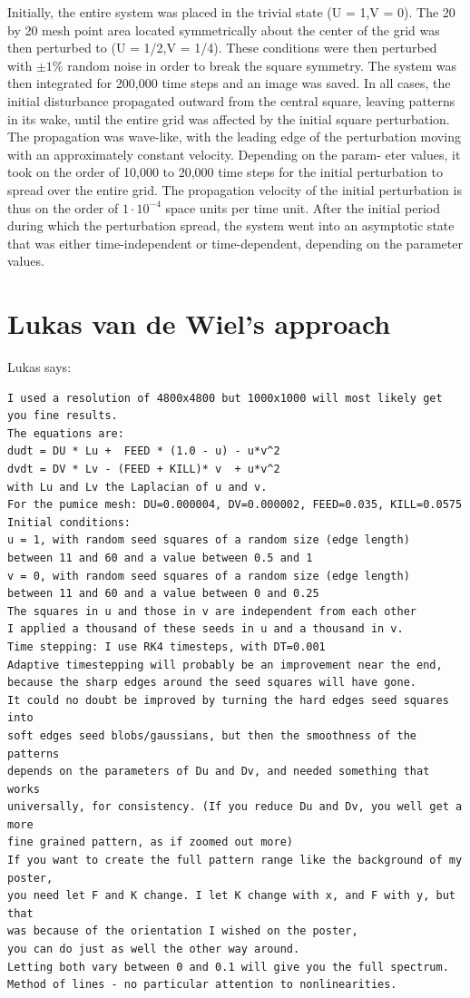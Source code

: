 Initially, the entire system was placed in the trivial state (U = 1,V = 0). The 20 by
20 mesh point area located symmetrically about the center of the grid was then
perturbed to (U = 1/2,V = 1/4). These conditions were then perturbed with $\pm 1\%$
random noise in order to break the square symmetry. The system was then integrated
for 200,000 time steps and an image was
saved. In all cases, the initial disturbance
propagated outward from the central
square, leaving patterns in its wake, until
the entire grid was affected by the initial
square perturbation. The propagation was
wave-like, with the leading edge of the
perturbation moving with an approximately
constant velocity. Depending on the param-
eter values, it took on the order of 10,000 to
20,000 time steps for the initial perturbation
to spread over the entire grid. The propagation velocity of the initial perturbation is
thus on the order of $1\cdot 10^{-4}$ space units per time unit. After the initial period during
which the perturbation spread, the system
went into an asymptotic state that was either
time-independent or time-dependent, depending on the parameter values.


\section*{Lukas van de Wiel's approach}

Lukas says:
\begin{verbatim}
I used a resolution of 4800x4800 but 1000x1000 will most likely get you fine results.
The equations are:
dudt = DU * Lu +  FEED * (1.0 - u) - u*v^2
dvdt = DV * Lv - (FEED + KILL)* v  + u*v^2
with Lu and Lv the Laplacian of u and v.
For the pumice mesh: DU=0.000004, DV=0.000002, FEED=0.035, KILL=0.0575
Initial conditions:
u = 1, with random seed squares of a random size (edge length) 
between 11 and 60 and a value between 0.5 and 1
v = 0, with random seed squares of a random size (edge length) 
between 11 and 60 and a value between 0 and 0.25
The squares in u and those in v are independent from each other
I applied a thousand of these seeds in u and a thousand in v.
Time stepping: I use RK4 timesteps, with DT=0.001
Adaptive timestepping will probably be an improvement near the end,  
because the sharp edges around the seed squares will have gone.
It could no doubt be improved by turning the hard edges seed squares into 
soft edges seed blobs/gaussians, but then the smoothness of the patterns
depends on the parameters of Du and Dv, and needed something that works 
universally, for consistency. (If you reduce Du and Dv, you well get a more 
fine grained pattern, as if zoomed out more) 
If you want to create the full pattern range like the background of my poster, 
you need let F and K change. I let K change with x, and F with y, but that 
was because of the orientation I wished on the poster,
you can do just as well the other way around.
Letting both vary between 0 and 0.1 will give you the full spectrum.
Method of lines - no particular attention to nonlinearities. 
\end{verbatim}

